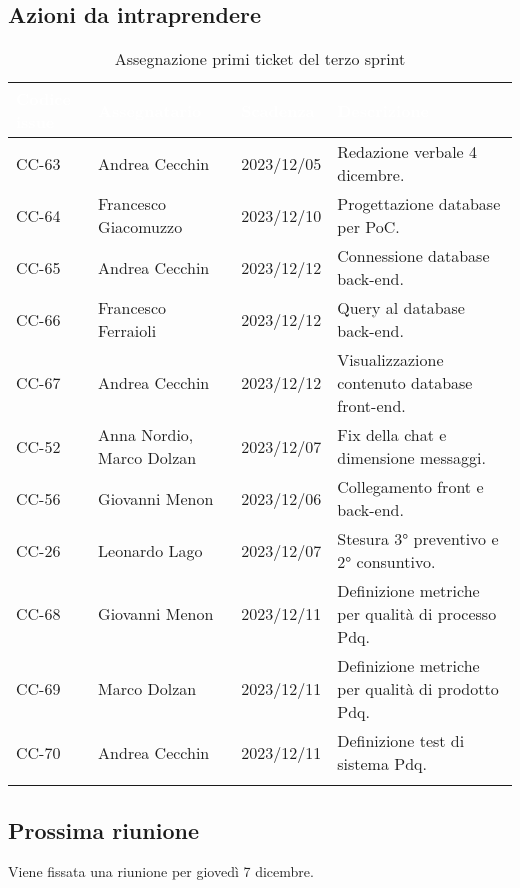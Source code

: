 \subsection{Azioni da intraprendere}
{
    \setlength{\tabcolsep}{10pt}
            \renewcommand{\arraystretch}{1.5}
            \begin{xltabular}{\textwidth}{| l | X | l | X |}
                 \hline
                 \textbf{\textcolor{white}{Codice issue}} & \textbf{\textcolor{white}{Assegnatario}} & \textbf{\textcolor{white}{Scadenza}} & \textbf{\textcolor{white}{Descrizione}} \\
                 \hline
                 \endhead
                 CC-63 & Andrea Cecchin & 2023/12/05 & Redazione verbale 4 dicembre. \\
                 \hline
                 CC-64 & Francesco Giacomuzzo & 2023/12/10 & Progettazione database per PoC. \\
                 \hline
                 CC-65 & Andrea Cecchin & 2023/12/12 & Connessione database back-end. \\
                 \hline
                 CC-66 & Francesco Ferraioli & 2023/12/12 & Query al database back-end. \\
                 \hline
                 CC-67 & Andrea Cecchin & 2023/12/12 & Visualizzazione contenuto database front-end. \\
                 \hline
                 CC-52 & Anna Nordio, Marco Dolzan& 2023/12/07 & Fix della chat e dimensione messaggi. \\
                 \hline
                 CC-56 & Giovanni Menon & 2023/12/06 & Collegamento front e back-end. \\
                 \hline
                 CC-26 & Leonardo Lago & 2023/12/07 & Stesura 3° preventivo e 2° consuntivo. \\
                 \hline
                 CC-68 & Giovanni Menon & 2023/12/11 & Definizione metriche per qualità di processo Pdq. \\
                 \hline
                 CC-69 & Marco Dolzan & 2023/12/11 & Definizione metriche per qualità di prodotto Pdq. \\
                 \hline
                 CC-70 & Andrea Cecchin & 2023/12/11 & Definizione test di sistema Pdq. \\
                 \hline
                  \caption{Assegnazione primi ticket del terzo sprint}
            \end{xltabular}
}


\subsection{Prossima riunione} \label{subsec:riunione}
Viene fissata una riunione per giovedì 7 dicembre.

